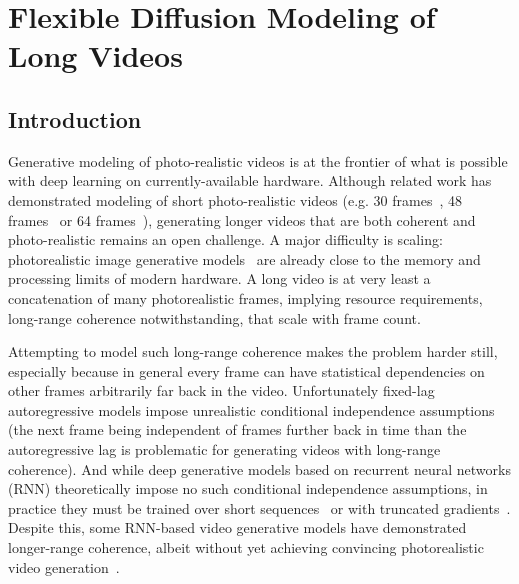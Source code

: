 \chapter{Flexible Diffusion Modeling of Long Videos}


\section{Introduction}\label{sec:intro}

Generative modeling of photo-realistic videos is at the frontier of what is possible with deep learning on currently-available hardware. Although related work has demonstrated modeling of short photo-realistic videos (e.g. 30 frames~\citep{weissenborn2019scaling}, 48 frames~\cite{clark2019adversarial} or 64 frames~\citep{ho2022video}), generating longer videos that are both coherent and photo-realistic remains an open challenge. A major difficulty is scaling: photorealistic image generative models~\citep{child2020very,dhariwal2021diffusion} are already close to the memory and processing limits of modern hardware.  A long video is at very least a concatenation of many photorealistic frames, implying resource requirements, long-range coherence notwithstanding, that scale with frame count. 

Attempting to model such long-range coherence makes the problem harder still, especially because in general every frame can have statistical dependencies on other frames arbitrarily far back in the video.
%
%
Unfortunately fixed-lag autoregressive models impose unrealistic conditional independence assumptions (the next frame being independent of frames further back in time than the autoregressive lag is problematic for generating videos with long-range coherence).  And while deep generative models based on recurrent neural networks (RNN) theoretically impose no such conditional independence assumptions, in practice they must be trained over short sequences~\cite{gruslys2016memory,saxena2021clockwork} or with truncated gradients~\citep{tallec2017unbiasing}.  Despite this, some RNN-based video generative models have demonstrated longer-range coherence, albeit without yet achieving convincing photorealistic video generation~\citep{saxena2021clockwork,babaeizadeh2021fitvid,denton2018stochastic,kim2019variational,babaeizadeh2017stochastic}.

